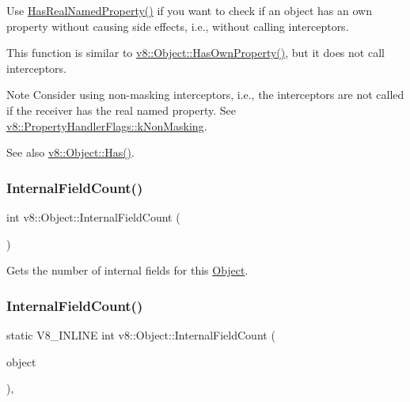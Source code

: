 Use \mbox{\hyperlink{classv8_1_1Object_ad830b937c7586fe2086b288ea79935c4}{Has\+Real\+Named\+Property()}} if you want to check if an object has an own property without causing side effects, i.\+e., without calling interceptors.

This function is similar to \mbox{\hyperlink{classv8_1_1Object_acdd3921e95d5bb1a27cea489792607ff}{v8\+::\+Object\+::\+Has\+Own\+Property()}}, but it does not call interceptors.

\begin{DoxyNote}{Note}
Consider using non-\/masking interceptors, i.\+e., the interceptors are not called if the receiver has the real named property. See {\ttfamily \mbox{\hyperlink{namespacev8_af4789f0aeb8680e353901a35810cac1aa8678eef5728c64ca2122dfe336f116aa}{v8\+::\+Property\+Handler\+Flags\+::k\+Non\+Masking}}}.
\end{DoxyNote}
See also \mbox{\hyperlink{classv8_1_1Object_a57d4819c2cc13715ed22dd23cdc84d7c}{v8\+::\+Object\+::\+Has()}}. \mbox{\label{classv8_1_1Object_aaec28576353eebe6fee113bce2718ecc}} 
\subsubsection{\texorpdfstring{Internal\+Field\+Count()}{InternalFieldCount()}\hspace{0.1cm}{\footnotesize\ttfamily [1/2]}}
{\footnotesize\ttfamily int v8\+::\+Object\+::\+Internal\+Field\+Count (\begin{DoxyParamCaption}{ }\end{DoxyParamCaption})}

Gets the number of internal fields for this \mbox{\hyperlink{classv8_1_1Object}{Object}}. \mbox{\label{classv8_1_1Object_a324a71142f621a32bfe5738648718370}} 
\subsubsection{\texorpdfstring{Internal\+Field\+Count()}{InternalFieldCount()}\hspace{0.1cm}{\footnotesize\ttfamily [2/2]}}
{\footnotesize\ttfamily static V8\+\_\+\+I\+N\+L\+I\+NE int v8\+::\+Object\+::\+Internal\+Field\+Count (\begin{DoxyParamCaption}\item[{const \mbox{\hyperlink{classv8_1_1PersistentBase}{Persistent\+Base}}$<$ \mbox{\hyperlink{classv8_1_1Object}{Object}} $>$ \&}]{object }\end{DoxyParamCaption})\hspace{0.3cm}{\ttfamily [inline]}, {\ttfamily [static]}}

